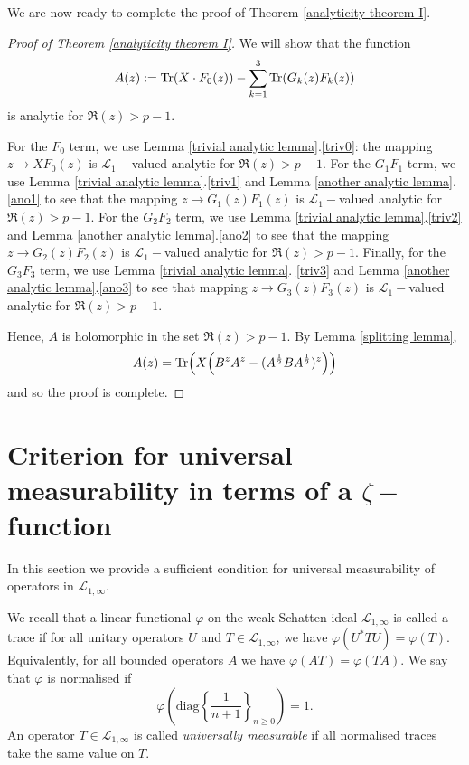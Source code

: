     We are now ready to complete the proof of Theorem \ref{analyticity theorem I}.

    \begin{proof}[Proof of Theorem \ref{analyticity theorem I}] 
        We will show that the function
        \begin{equation*}
            A(z) := {\rm Tr}(X\cdot F_0(z))-\sum_{k=1}^3{\rm Tr}(G_k(z)F_k(z))        
        \end{equation*}
        is analytic for $\Re(z) > p-1$.
        
        For the $F_0$ term, we use Lemma \ref{trivial analytic lemma}.\eqref{triv0}: the mapping $z\to XF_0(z)$ is $\mathcal{L}_1-$valued analytic for $\Re(z)>p-1.$ 
        For the $G_1F_1$ term, we use Lemma \ref{trivial analytic lemma}.\eqref{triv1} and Lemma \ref{another analytic lemma}.\eqref{ano1} to see that the mapping $z\to G_1(z)F_1(z)$ is $\mathcal{L}_1-$valued analytic for $\Re(z)>p-1.$ 
        For the $G_2F_2$ term, we use Lemma \ref{trivial analytic lemma}.\eqref{triv2} 
        and Lemma \ref{another analytic lemma}.\eqref{ano2} to see that the mapping $z\to G_2(z)F_2(z)$ is $\mathcal{L}_1-$valued analytic for $\Re(z)>p-1.$ 
        Finally, for the $G_3F_3$ term, we use Lemma \ref{trivial analytic lemma}.
        \eqref{triv3} and Lemma \ref{another analytic lemma}.\eqref{ano3} to see that mapping $z\to G_3(z)F_3(z)$ is $\mathcal{L}_1-$valued analytic for $\Re(z)>p-1.$
        
        Hence, $A$ is holomorphic in the set $\Re(z) > p-1$. By Lemma \ref{splitting lemma},
        \begin{equation*}
            A(z) = {\rm Tr}\Big(X\Big(B^zA^z-(A^{\frac12}BA^{\frac12})^z\Big)\Big)
        \end{equation*}
        and so the proof is complete.
    \end{proof}

\section{Criterion for universal measurability in terms of a $\zeta-$function}\label{subhankulov section}
    In this section we provide a sufficient condition for universal measurability of operators in $\mathcal{L}_{1,\infty}$. 
    
    We recall that a linear functional $\varphi$ on the weak Schatten ideal $\mathcal{L}_{1,\infty}$ is called
    a trace if for all unitary operators $U$ and $T \in \mathcal{L}_{1,\infty}$, we have $\varphi(U^*TU) = \varphi(T)$. Equivalently,
    for all bounded operators $A$ we have $\varphi(AT) = \varphi(TA)$. We say that $\varphi$ is normalised if 
    \begin{equation*}
        \varphi\left(\mathrm{diag}\left\{\frac{1}{n+1}\right\}_{n\geq 0}\right) = 1.
    \end{equation*}
    An operator $T \in \mathcal{L}_{1,\infty}$ is called \emph{universally measurable} if all normalised traces take the same value on $T$.
    
